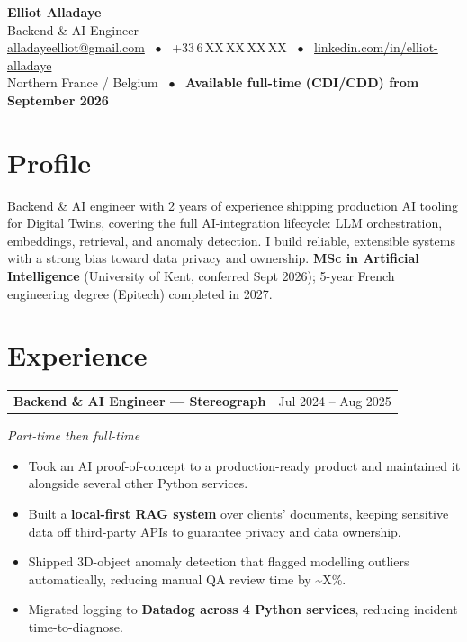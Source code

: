 \documentclass[10pt,a4paper]{article}
\makeatletter
\newcommand{\entry}[2]{%
  \vspace{1pt}\noindent\begin{tabular*}{\textwidth}{@{}l@{\extracolsep{\fill}}r@{}}
  \textbf{#1} & #2 \\
  \end{tabular*}\par}
\newcommand{\subentry}[1]{\noindent\textit{#1}\par\vspace{1pt}}
\makeatother
\begin{document}
\begin{center}
  {\Huge\bfseries Elliot Alladaye}\\[3pt]
  {\large\color{accent} Backend \& AI Engineer}\\[5pt]
  \small
  \href{mailto:alladayeelliot@gmail.com}{alladayeelliot@gmail.com} ~$\bullet$~
  +33\,6\,XX\,XX\,XX\,XX ~$\bullet$~
  \href{https://www.linkedin.com/in/elliot-alladaye}{linkedin.com/in/elliot-alladaye}\\[2pt]
  Northern France / Belgium ~$\bullet$~ \textbf{Available full-time (CDI/CDD) from September 2026}
\end{center}
\vspace{2pt}

\section{Profile}
Backend \& AI engineer with 2 years of experience shipping production AI tooling for Digital Twins, covering the full AI-integration lifecycle: LLM orchestration, embeddings, retrieval, and anomaly detection. I build reliable, extensible systems with a strong bias toward data privacy and ownership. \textbf{MSc in Artificial Intelligence} (University of Kent, conferred Sept 2026); 5-year French engineering degree (Epitech) completed in 2027.

\section{Experience}

\entry{Backend \& AI Engineer --- Stereograph}{Jul 2024 -- Aug 2025}
\subentry{Part-time then full-time}
\begin{itemize}
  \item Took an AI proof-of-concept to a production-ready product and maintained it alongside several other Python services.
  \item Built a \textbf{local-first RAG system} over clients' documents, keeping sensitive data off third-party APIs to guarantee privacy and data ownership.
  \item Shipped 3D-object anomaly detection that flagged modelling outliers automatically, reducing manual QA review time by \textasciitilde X\%.
  \item Migrated logging to \textbf{Datadog across 4 Python services}, reducing incident time-to-diagnose.
\end{itemize}
\end{document}
